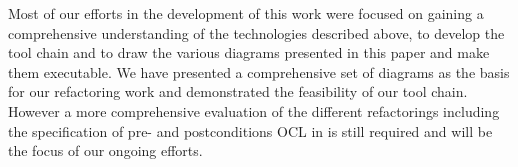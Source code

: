 \documentclass{llncs}
\begin{document}
Most of our efforts in the development of this work were focused on gaining a comprehensive understanding of the
technologies described above, to develop the tool chain and to draw the various diagrams presented in this paper and make 
them executable. We have presented a comprehensive set of diagrams as the basis for our refactoring work and demonstrated 
the feasibility of our tool chain. However a more comprehensive evaluation of the different refactorings including the 
specification of pre- and postconditions OCL in is still required and will be the focus of our ongoing efforts.

\newpage


\end{document}
